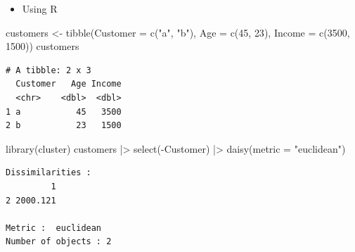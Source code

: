 \documentclass[
  ignorenonframetext,
]{beamer}
\newenvironment{Shaded}{\begin{snugshade}}{\end{snugshade}}
\newcommand{\AttributeTok}[1]{\textcolor[rgb]{0.40,0.45,0.13}{#1}}
\newcommand{\DecValTok}[1]{\textcolor[rgb]{0.68,0.00,0.00}{#1}}
\newcommand{\FunctionTok}[1]{\textcolor[rgb]{0.28,0.35,0.67}{#1}}
\newcommand{\NormalTok}[1]{\textcolor[rgb]{0.00,0.23,0.31}{#1}}
\newcommand{\OtherTok}[1]{\textcolor[rgb]{0.00,0.23,0.31}{#1}}
\newcommand{\SpecialCharTok}[1]{\textcolor[rgb]{0.37,0.37,0.37}{#1}}
\newcommand{\StringTok}[1]{\textcolor[rgb]{0.13,0.47,0.30}{#1}}
\providecommand{\tightlist}{%
  \setlength{\itemsep}{0pt}\setlength{\parskip}{0pt}}\usepackage{longtable,booktabs,array}
\begin{document}
\begin{frame}[fragile]{}
\label{section-11}
\begin{itemize}
\tightlist
\item
  Using R
\end{itemize}

\tiny

\begin{Shaded}
\begin{Highlighting}[]
\NormalTok{customers }\OtherTok{\textless{}{-}} \FunctionTok{tibble}\NormalTok{(}\AttributeTok{Customer =} \FunctionTok{c}\NormalTok{(}\StringTok{"a"}\NormalTok{, }\StringTok{"b"}\NormalTok{),}
                    \AttributeTok{Age =} \FunctionTok{c}\NormalTok{(}\DecValTok{45}\NormalTok{, }\DecValTok{23}\NormalTok{),}
                    \AttributeTok{Income =} \FunctionTok{c}\NormalTok{(}\DecValTok{3500}\NormalTok{, }\DecValTok{1500}\NormalTok{))}
\NormalTok{customers}
\end{Highlighting}
\end{Shaded}

\begin{verbatim}
# A tibble: 2 x 3
  Customer   Age Income
  <chr>    <dbl>  <dbl>
1 a           45   3500
2 b           23   1500
\end{verbatim}

\begin{Shaded}
\begin{Highlighting}[]
\FunctionTok{library}\NormalTok{(cluster)}
\NormalTok{customers }\SpecialCharTok{|\textgreater{}} 
  \FunctionTok{select}\NormalTok{(}\SpecialCharTok{{-}}\NormalTok{Customer) }\SpecialCharTok{|\textgreater{}} 
  \FunctionTok{daisy}\NormalTok{(}\AttributeTok{metric =} \StringTok{"euclidean"}\NormalTok{)}
\end{Highlighting}
\end{Shaded}

\begin{verbatim}
Dissimilarities :
         1
2 2000.121

Metric :  euclidean 
Number of objects : 2
\end{verbatim}
\end{frame}
\end{document}
